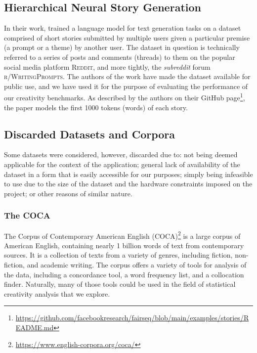 \subsection{Hierarchical Neural Story Generation}
In their work, \cite{fan_hierarchical_2018} trained a language model for text generation tasks on a dataset comprised of short stories submitted by multiple users given a particular premise (a prompt or a theme) by another user.  The dataset in question is technically referred to a series of posts and comments (threads) to them on the popular social media platform \textsc{Reddit}, and more tightly, the \textit{subreddit} forum \textsc{r/WritingPrompts}. The authors of the work \cite{fan_hierarchical_2018} have made the dataset available for public use, and we have used it for the purpose of evaluating the performance of our creativity benchmarks. As described by the authors on their GitHub page\footnote{\url{https://github.com/facebookresearch/fairseq/blob/main/examples/stories/README.md}}, the paper models the first 1000 tokens (words) of each story.


\subsection*{Discarded Datasets and Corpora}
Some datasets were considered, however, discarded due to: not being deemed applicable for the context of the application; general lack of availability of the dataset in a form that is easily accessible for our purposes; simply being infeasible to use due to the size of the dataset and the hardware constraints imposed on the project; or other reasons of similar nature.

\subsubsection*{The COCA}
The Corpus of Contemporary American English (COCA)\footnote[2]{\url{https://www.english-corpora.org/coca/}} is a large corpus of American English, containing nearly 1 billion words of text from contemporary sources. It is a collection of texts from a variety of genres, including fiction, non-fiction, and academic writing. The corpus offers a variety of tools for analysis of the data, including a concordance tool, a word frequency list, and a collocation finder. Naturally, many of those tools could be used in the field of statistical creativity analysis that we explore.

